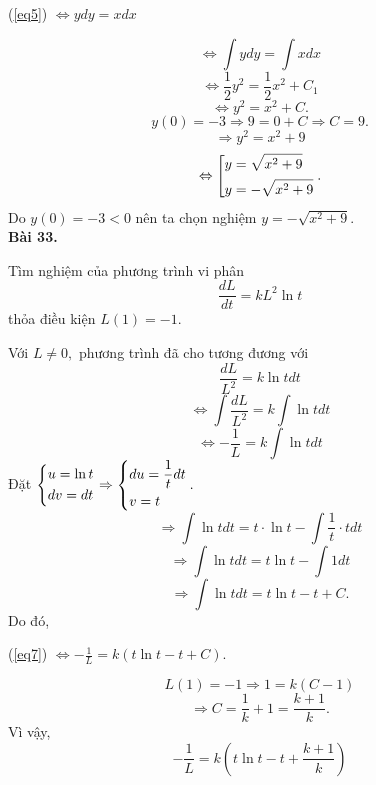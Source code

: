 \documentclass[12pt,a4paper]{article}
\begin{document}
\begin{center}
(\ref{eq5}) \( \Leftrightarrow ydy = xdx\)
\end{center}
\[ \Leftrightarrow \int {ydy}  = \int {xdx} \]
\[ \Leftrightarrow \frac{1}{2}{y^2} = \frac{1}{2}{x^2} + {C_1}\]
\[ \Leftrightarrow {y^2} = {x^2} + C.\]
\[y\left( 0 \right) =  - 3 \Rightarrow 9 = 0 + C \Rightarrow C = 9.\]
\[ \Rightarrow {y^2} = {x^2} + 9\]
\[ \Leftrightarrow \left[ \begin{gathered}
  y = \sqrt {{x^2} + 9}  \hfill \\
  y =  - \sqrt {{x^2} + 9}  \hfill \\ 
\end{gathered}  \right..\]
Do \(y\left( 0 \right) =  - 3 < 0\) nên ta chọn nghiệm \(y =  - \sqrt {{x^2} + 9} .\)\\
\textbf{Bài 33.}
\begin{mybox}
Tìm nghiệm của phương trình vi phân 
\begin{equation}
\frac{{dL}}{{dt}} = k{L^2}\ln t
\label{eq6}
\end{equation}
thỏa điều kiện \(L\left( 1 \right) =  - 1.\)
\end{mybox}
Với \(L \ne 0,\) phương trình đã cho tương đương với
\[\frac{{dL}}{{{L^2}}} = k\ln tdt\]
\[ \Leftrightarrow \int {\frac{{dL}}{{{L^2}}}}  = k\int {\ln tdt} \]
\begin{equation}
\Leftrightarrow  - \frac{1}{L} = k\int {\ln tdt} 
\label{eq7}
\end{equation}
Đặt \(\left\{ \begin{gathered}
  u = \ln t \hfill \\
  dv = dt \hfill \\ 
\end{gathered}  \right. \Rightarrow \left\{ \begin{gathered}
  du = \frac{1}{t}dt \hfill \\
  v = t \hfill \\ 
\end{gathered}  \right..\)
\[ \Rightarrow \int {\ln tdt}  = t \cdot \ln t - \int {\frac{1}{t} \cdot tdt} \]
\[ \Rightarrow \int {\ln tdt}  = t\ln t - \int {1dt} \]
\[ \Rightarrow \int {\ln tdt}  = t\ln t - t + C.\]
Do đó,
\begin{center}
(\ref{eq7}) \( \Leftrightarrow  - \frac{1}{L} = k\left( {t\ln t - t + C} \right).\)
\end{center}
\[L\left( 1 \right) =  - 1 \Rightarrow 1 = k\left( {C - 1} \right)\]
\[ \Rightarrow C = \frac{1}{k} + 1 = \frac{{k + 1}}{k}.\]
Vì vậy,
\[ - \frac{1}{L} = k\left( {t\ln t - t + \frac{{k + 1}}{k}} \right)\]
\end{document}
